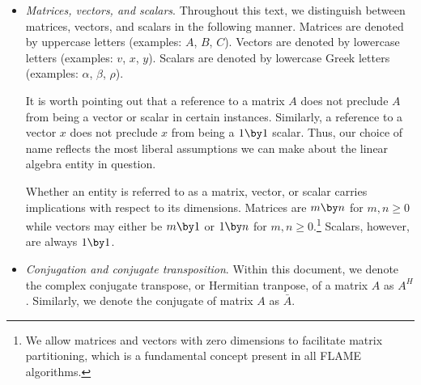 \begin{itemize}

\item
{\em Matrices, vectors, and scalars}.
Throughout this text, we distinguish between matrices, vectors,
and scalars in the following manner.
Matrices are denoted by uppercase letters (examples: $ A $, $ B $, $ C $).
Vectors are denoted by lowercase letters (examples: $ v $, $ x $, $ y $).
Scalars are denoted by lowercase Greek letters (examples: $ \alpha $,
$ \beta $, $ \rho $).

It is worth pointing out that a reference to a matrix $ A $ does not
preclude $ A $ from being a vector or scalar in certain instances.
Similarly, a reference to a vector $ x $ does not preclude $ x $ from being
a $ 1 \by 1 $ scalar.
Thus, our choice of name reflects the most liberal assumptions we can make
about the linear algebra entity in question.

Whether an entity is referred to as a matrix, vector, or scalar carries
implications with respect to its dimensions.
Matrices are $ m \by n $ for $ m,n \ge 0 $ while vectors may either be
$ m \by 1 $ or $ 1 \by n $ for $ m,n \ge 0 $.\footnote{We allow matrices and
vectors with zero dimensions to facilitate matrix partitioning, which is a
fundamental concept present in all FLAME algorithms\cite{Recipe}.}
Scalars, however, are always $ 1 \by 1 $.

\item
{\em Conjugation and conjugate transposition}.
Within this document, we denote the complex conjugate transpose, or Hermitian
tranpose, of a matrix $ A $ as $ A^H $.
Similarly, we denote the conjugate of matrix $ A $ as $ \bar{A} $.


\end{itemize}
